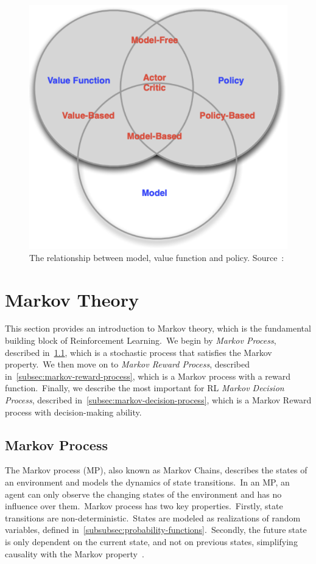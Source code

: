 \documentclass[../xlapes02]{subfiles}
\begin{document}
    \begin{figure}[h]
        \includegraphics[width=0.5\linewidth]{image/model-value-policy}
        \centering
        \caption{The relationship between model, value function and policy. Source~\cite{FITMT25127}:}
        \label{fig:model-value-policy-introduction}
    \end{figure}


    \section{Markov Theory}\label{sec:markov-theory}
    This section provides an introduction to Markov theory, which is the fundamental building block of Reinforcement Learning.\ We begin by \emph{Markov Process}, described in~\cref{subsec:markov-process}, which is a stochastic process that satisfies the Markov property.\ We then move on to \emph{Markov Reward Process}, described in~\cref{subsec:markov-reward-process}, which is a Markov process with a reward function.\ Finally, we describe the most important for RL \emph{Markov Decision Process}, described in~\cref{subsec:markov-decision-process}, which is a Markov Reward process with decision-making ability.

    \subsection{Markov Process}\label{subsec:markov-process}
    The Markov process (MP), also known as Markov Chains, describes the states of an environment and models the dynamics of state transitions.\ In an MP, an agent can only observe the changing states of the environment and has no influence over them.\ Markov process has two key properties.\ Firstly, state transitions are non-deterministic.\ States are modeled as realizations of random variables, defined in~\cref{subsubsec:probability-functions}.\ Secondly, the future state is only dependent on the current state, and not on previous states, simplifying causality with the Markov property~\cite{rao2022foundations, inproceedings}.
\end{document}
